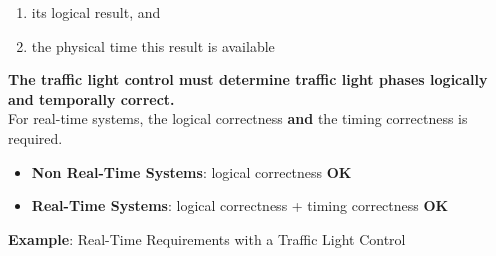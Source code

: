 \begin{enumerate}
	\item  its logical result, and
	\item  the physical time this result is available
\end{enumerate}

\begin{figure}%
    \centering
    \qquad
    \qquad
    \label{fig:Fig 3}%
\end{figure}

\textbf{The traffic light control must determine traffic light phases logically and temporally correct.}\\

For real-time systems, the logical correctness \textbf{and} the timing correctness is required.

\begin{itemize}
	\item \textbf{Non Real-Time Systems}:  logical correctness  \textbf{OK}
	\item \textbf{Real-Time Systems}:    logical correctness + timing correctness  \textbf{OK}
\end{itemize}

\textbf{Example}: Real-Time Requirements with a Traffic Light Control

